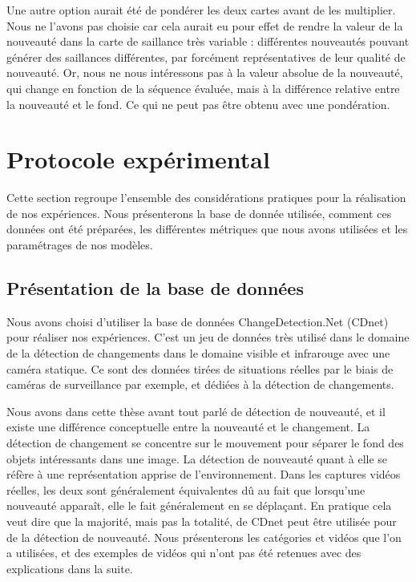 	Une autre option aurait été de pondérer les deux cartes avant de les multiplier. Nous ne l'avons pas choisie car cela aurait eu pour effet de rendre la valeur de la nouveauté dans la carte de saillance très variable : différentes nouveautés pouvant générer des saillances différentes, par forcément représentatives de leur qualité de nouveauté. Or, nous ne nous intéressons pas à la valeur absolue de la nouveauté, qui change en fonction de la séquence évaluée, mais à la différence relative entre la nouveauté et le fond. Ce qui ne peut pas être obtenu avec une pondération.

	\newpage
	\section{Protocole expérimental}

	Cette section regroupe l'ensemble des considérations pratiques pour la réalisation de nos expériences. Nous présenterons la base de donnée utilisée, comment ces données ont été préparées, les différentes métriques que nous avons utilisées et les paramétrages de nos modèles.

	\subsection{Présentation de la base de données}

	Nous avons choisi d'utiliser la base de données ChangeDetection.Net (CDnet) \cite{wang-cdnet} pour réaliser nos expériences. C'est un jeu de données très utilisé dans le domaine de la détection de changements dans le domaine visible et infrarouge avec une caméra statique. Ce sont des données tirées de situations réelles par le biais de caméras de surveillance par exemple, et dédiées à la détection de changements.

	Nous avons dans cette thèse avant tout parlé de détection de nouveauté, et il existe une différence conceptuelle entre la nouveauté et le changement. La détection de changement se concentre sur le mouvement pour séparer le fond des objets intéressants dans une image. La détection de nouveauté quant à elle se réfère à une représentation apprise de l'environnement. Dans les captures vidéos réelles, les deux sont généralement équivalentes dû au fait que lorsqu'une nouveauté apparaît, elle le fait généralement en se déplaçant. En pratique cela veut dire que la majorité, mais pas la totalité, de CDnet peut être utilisée pour de la détection de nouveauté. Nous présenterons les catégories et vidéos que l'on a utilisées, et des exemples de vidéos qui n'ont pas été retenues avec des explications dans la suite.
	
